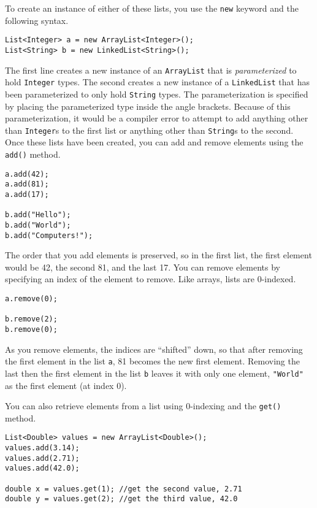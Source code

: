 To create an instance of either of these lists, you use the
\texttt{new} keyword and the following syntax.

\begin{verbatim}
List<Integer> a = new ArrayList<Integer>();
List<String> b = new LinkedList<String>();
\end{verbatim}

The first line creates a new instance of an \texttt{ArrayList}
that is \emph{parameterized} to hold \texttt{Integer} 
types.  The second creates a new instance of a \texttt{LinkedList}
that has been parameterized to only hold \texttt{String}
types.  The parameterization is specified by placing the parameterized
type inside the angle brackets. Because of this parameterization, 
it would be a 
compiler error to attempt to add anything other than \texttt{Integer}s
to the first list or anything other than \texttt{String}s to the
second. Once these lists have been created, you can add and remove
elements using the \texttt{add()} method.

\begin{verbatim}
a.add(42);
a.add(81);
a.add(17);

b.add("Hello");
b.add("World");
b.add("Computers!");
\end{verbatim}

The order that you add elements is preserved, so in the first list, the
first element would be 42, the second 81, and the last 17.  You can
remove elements by specifying an index of the element to remove.
Like arrays, lists are 0-indexed.

\begin{verbatim}
a.remove(0);

b.remove(2);
b.remove(0);
\end{verbatim}

As you remove elements, the indices are ``shifted'' down, so that after
removing the first element in the list \texttt{a}, 81 becomes
the new first element.  Removing the last then the first element in the
list \texttt{b} leaves it with only one element, \texttt{"World"}
as the first element (at index 0).

You can also retrieve elements from a list using 0-indexing and
the \texttt{get()} method. 

\begin{verbatim}
List<Double> values = new ArrayList<Double>();
values.add(3.14);
values.add(2.71);
values.add(42.0);

double x = values.get(1); //get the second value, 2.71
double y = values.get(2); //get the third value, 42.0
\end{verbatim}

